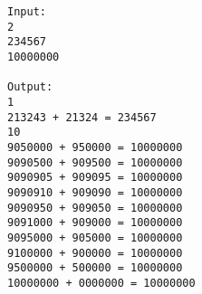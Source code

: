 \begin{verbatim}
Input:
2
234567
10000000

Output:
1
213243 + 21324 = 234567
10
9050000 + 950000 = 10000000
9090500 + 909500 = 10000000
9090905 + 909095 = 10000000
9090910 + 909090 = 10000000
9090950 + 909050 = 10000000
9091000 + 909000 = 10000000
9095000 + 905000 = 10000000
9100000 + 900000 = 10000000
9500000 + 500000 = 10000000
10000000 + 0000000 = 10000000

\end{verbatim}